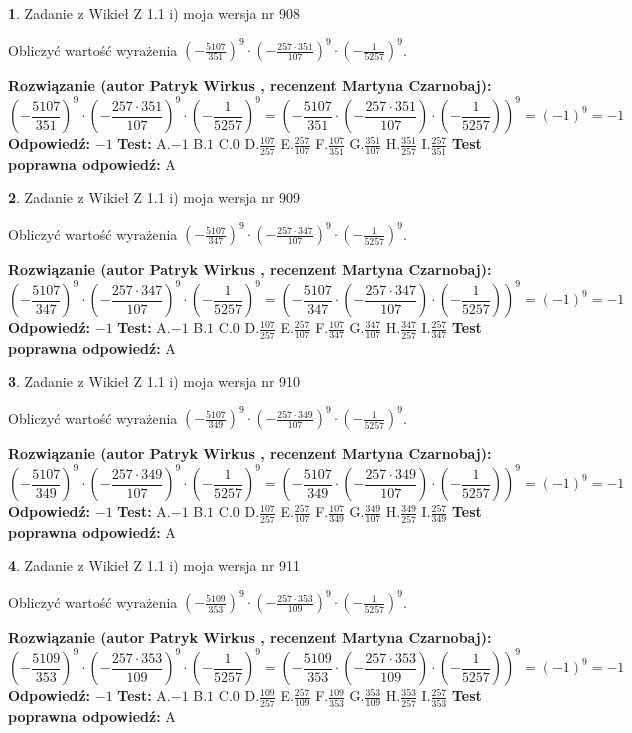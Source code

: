 \documentclass[12pt, a4paper]{article}
\theoremstyle{definition} %
\newtheorem{zad}{}
\newcommand{\zadStart}[1]{\begin{zad}#1\newline}
\newcommand{\zadStop}{\end{zad}}
\newcommand{\rozwStart}[2]{\noindent \textbf{Rozwiązanie (autor #1 , recenzent #2): }\newline}
\newcommand{\rozwStop}{\newline}
\newcommand{\odpStart}{\noindent \textbf{Odpowiedź:}\newline}
\newcommand{\odpStop}{\newline}
\newcommand{\testStart}{\noindent \textbf{Test:}\newline}
\newcommand{\testStop}{\newline}
\newcommand{\kluczStart}{\noindent \textbf{Test poprawna odpowiedź:}\newline}
\newcommand{\kluczStop}{\newline}
\begin{document}
\zadStart{Zadanie z Wikieł Z 1.1 i) moja wersja nr 908}

Obliczyć wartość wyrażenia $(-\frac{5107}{351})^{9} \cdot (-\frac{257 \cdot 351}{107})^{9} \cdot (-\frac{1}{5257})^{9}$.
\zadStop
\rozwStart{Patryk Wirkus}{Martyna Czarnobaj}
$$(-\frac{5107}{351})^{9} \cdot (-\frac{257 \cdot 351}{107})^{9} \cdot (-\frac{1}{5257})^{9} = (-\frac{5107}{351} \cdot (-\frac{257 \cdot 351}{107}) \cdot (-\frac{1}{5257}))^{9} = (-1)^{9} = -1$$
\rozwStop
\odpStart
$-1$
\odpStop
\testStart
A.$-1$ B.$1$ C.$0$ D.$\frac{107}{257}$ E.$\frac{257}{107}$
F.$\frac{107}{351}$ G.$\frac{351}{107}$
H.$\frac{351}{257}$
I.$\frac{257}{351}$
\testStop
\kluczStart
A
\kluczStop



\zadStart{Zadanie z Wikieł Z 1.1 i) moja wersja nr 909}

Obliczyć wartość wyrażenia $(-\frac{5107}{347})^{9} \cdot (-\frac{257 \cdot 347}{107})^{9} \cdot (-\frac{1}{5257})^{9}$.
\zadStop
\rozwStart{Patryk Wirkus}{Martyna Czarnobaj}
$$(-\frac{5107}{347})^{9} \cdot (-\frac{257 \cdot 347}{107})^{9} \cdot (-\frac{1}{5257})^{9} = (-\frac{5107}{347} \cdot (-\frac{257 \cdot 347}{107}) \cdot (-\frac{1}{5257}))^{9} = (-1)^{9} = -1$$
\rozwStop
\odpStart
$-1$
\odpStop
\testStart
A.$-1$ B.$1$ C.$0$ D.$\frac{107}{257}$ E.$\frac{257}{107}$
F.$\frac{107}{347}$ G.$\frac{347}{107}$
H.$\frac{347}{257}$
I.$\frac{257}{347}$
\testStop
\kluczStart
A
\kluczStop



\zadStart{Zadanie z Wikieł Z 1.1 i) moja wersja nr 910}

Obliczyć wartość wyrażenia $(-\frac{5107}{349})^{9} \cdot (-\frac{257 \cdot 349}{107})^{9} \cdot (-\frac{1}{5257})^{9}$.
\zadStop
\rozwStart{Patryk Wirkus}{Martyna Czarnobaj}
$$(-\frac{5107}{349})^{9} \cdot (-\frac{257 \cdot 349}{107})^{9} \cdot (-\frac{1}{5257})^{9} = (-\frac{5107}{349} \cdot (-\frac{257 \cdot 349}{107}) \cdot (-\frac{1}{5257}))^{9} = (-1)^{9} = -1$$
\rozwStop
\odpStart
$-1$
\odpStop
\testStart
A.$-1$ B.$1$ C.$0$ D.$\frac{107}{257}$ E.$\frac{257}{107}$
F.$\frac{107}{349}$ G.$\frac{349}{107}$
H.$\frac{349}{257}$
I.$\frac{257}{349}$
\testStop
\kluczStart
A
\kluczStop



\zadStart{Zadanie z Wikieł Z 1.1 i) moja wersja nr 911}

Obliczyć wartość wyrażenia $(-\frac{5109}{353})^{9} \cdot (-\frac{257 \cdot 353}{109})^{9} \cdot (-\frac{1}{5257})^{9}$.
\zadStop
\rozwStart{Patryk Wirkus}{Martyna Czarnobaj}
$$(-\frac{5109}{353})^{9} \cdot (-\frac{257 \cdot 353}{109})^{9} \cdot (-\frac{1}{5257})^{9} = (-\frac{5109}{353} \cdot (-\frac{257 \cdot 353}{109}) \cdot (-\frac{1}{5257}))^{9} = (-1)^{9} = -1$$
\rozwStop
\odpStart
$-1$
\odpStop
\testStart
A.$-1$ B.$1$ C.$0$ D.$\frac{109}{257}$ E.$\frac{257}{109}$
F.$\frac{109}{353}$ G.$\frac{353}{109}$
H.$\frac{353}{257}$
I.$\frac{257}{353}$
\testStop
\kluczStart
A
\kluczStop
\end{document}

